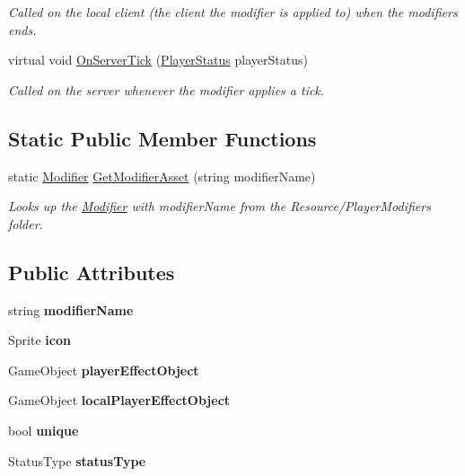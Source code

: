 \begin{DoxyCompactItemize}
\begin{DoxyCompactList}\small\item\em Called on the local client (the client the modifier is applied to) when the modifiers ends. \end{DoxyCompactList}\item 
virtual void \hyperlink{class_modifier_ac084768937c10fbcc456c37ec9f634fb}{On\+Server\+Tick} (\hyperlink{class_player_status}{Player\+Status} player\+Status)
\begin{DoxyCompactList}\small\item\em Called on the server whenever the modifier applies a tick. \end{DoxyCompactList}\end{DoxyCompactItemize}
\subsection*{Static Public Member Functions}
\begin{DoxyCompactItemize}
\item 
static \hyperlink{class_modifier}{Modifier} \hyperlink{class_modifier_a3112ab2082670bba7c86d2c77a3344fb}{Get\+Modifier\+Asset} (string modifier\+Name)
\begin{DoxyCompactList}\small\item\em Looks up the \hyperlink{class_modifier}{Modifier} with modifier\+Name from the Resource/\+Player\+Modifiers folder. \end{DoxyCompactList}\end{DoxyCompactItemize}
\subsection*{Public Attributes}
\begin{DoxyCompactItemize}
\item 
\hypertarget{class_modifier_a6e8161ccb82c398759fbe8d1e9b5d587}{}\label{class_modifier_a6e8161ccb82c398759fbe8d1e9b5d587} 
string {\bfseries modifier\+Name}
\item 
\hypertarget{class_modifier_a3edfd9ee4688a25351033f0d659f27a4}{}\label{class_modifier_a3edfd9ee4688a25351033f0d659f27a4} 
Sprite {\bfseries icon}
\item 
\hypertarget{class_modifier_af690cc49a109ea255a3172d8e6e20988}{}\label{class_modifier_af690cc49a109ea255a3172d8e6e20988} 
Game\+Object {\bfseries player\+Effect\+Object}
\item 
\hypertarget{class_modifier_af8920e799640ce9e8280a6068497b873}{}\label{class_modifier_af8920e799640ce9e8280a6068497b873} 
Game\+Object {\bfseries local\+Player\+Effect\+Object}
\item 
\hypertarget{class_modifier_aba371857276313505c3c364d28baf26f}{}\label{class_modifier_aba371857276313505c3c364d28baf26f} 
bool {\bfseries unique}
\item 
\hypertarget{class_modifier_ae775f9604c1f0e7f46573a8b5eb35e78}{}\label{class_modifier_ae775f9604c1f0e7f46573a8b5eb35e78} 
Status\+Type {\bfseries status\+Type}
\end{DoxyCompactItemize}



